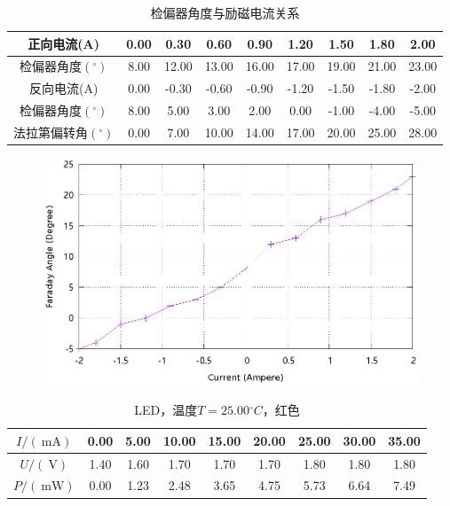 \documentclass{ctexart}
\newcommand{\si}[1]{\  \mathrm{#1}}
\begin{document}
\begin{table}[H]
    \centering
    \begin{tabular}{|c|c|c|c|c|c|c|c|c|}
        \hline
        正向电流(A)              & 0.00 & 0.30 & 0.60 & 0.90 & 1.20 & 1.50 & 1.80 & 2.00 \\\hline
        检偏器角度$({}^{\circ})$  & 8.00 & 12.00 & 13.00 & 16.00 & 17.00 & 19.00 & 21.00 & 23.00 \\\hline
        反向电流(A)              & 0.00 & -0.30 & -0.60 & -0.90 & -1.20 & -1.50 & -1.80 & -2.00 \\\hline
        检偏器角度$({}^{\circ})$  & 8.00 & 5.00 & 3.00 & 2.00 & 0.00 & -1.00 & -4.00 & -5.00 \\\hline
        法拉第偏转角$({}^{\circ})$ & 0.00 & 7.00 & 10.00 & 14.00 & 17.00 & 20.00 & 25.00 & 28.00 \\\hline
    \end{tabular}
    \caption{检偏器角度与励磁电流关系}
\end{table}
\begin{figure}[H]
    \centering
    \includegraphics[width=0.9\linewidth]{../output/light-intensity-analyzer-angle.gnuplot}
\end{figure}
\newpage
\begin{table}[H]
    \centering
    \begin{tabular}{|c|c|c|c|c|c|c|c|c|}
        \hline
        $I/(\si{mA})$   & 0.00 & 5.00 & 10.00 & 15.00 & 20.00 & 25.00 & 30.00 & 35.00 \\\hline
        $U / (\si{V})$  & 1.40 & 1.60 & 1.70 & 1.70 & 1.70 & 1.80 & 1.80 & 1.80 \\\hline
        $P / (\si{mW})$ & 0.00 & 1.23 & 2.48 & 3.65 & 4.75 & 5.73 & 6.64 & 7.49 \\\hline
    \end{tabular}
    \caption{LED，温度$T=25.00{}^{\circ}C$，红色}
\end{table}
\end{document}
